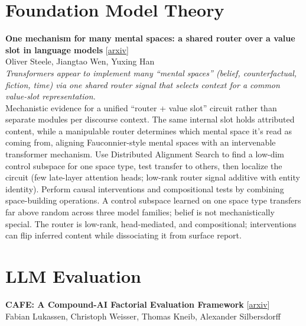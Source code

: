 \documentclass[12pt,letterpaper]{article}
\begin{document}
\medskip


\section*{Foundation Model Theory}

{\small\textbf{One mechanism for many mental spaces: a shared router over a value slot in language models}} {\scriptsize[\href{https://arxiv.org/abs/2607.10248}{arxiv}]}\\
{\scriptsize Oliver Steele, Jiangtao Wen, Yuxing Han}\\

{\small\textit{Transformers appear to implement many ``mental spaces'' (belief, counterfactual, fiction, time) via one shared router signal that selects context for a common value-slot representation.}}\\[1pt]
{\footnotesize Mechanistic evidence for a unified ``router + value slot'' circuit rather than separate modules per discourse context. The same internal slot holds attributed content, while a manipulable router determines which mental space it's read as coming from, aligning Fauconnier-style mental spaces with an intervenable transformer mechanism. Use Distributed Alignment Search to find a low-dim control subspace for one space type, test transfer to others, then localize the circuit (few late-layer attention heads; low-rank router signal additive with entity identity). Perform causal interventions and compositional tests by combining space-building operations. A control subspace learned on one space type transfers far above random across three model families; belief is not mechanistically special. The router is low-rank, head-mediated, and compositional; interventions can flip inferred content while dissociating it from surface report.}

\medskip


\section*{LLM Evaluation}

{\small\textbf{CAFE: A Compound-AI Factorial Evaluation Framework}} {\scriptsize[\href{https://arxiv.org/abs/2607.10380}{arxiv}]}\\
{\scriptsize Fabian Lukassen, Christoph Weisser, Thomas Kneib, Alexander Silbersdorff}\\
\end{document}
